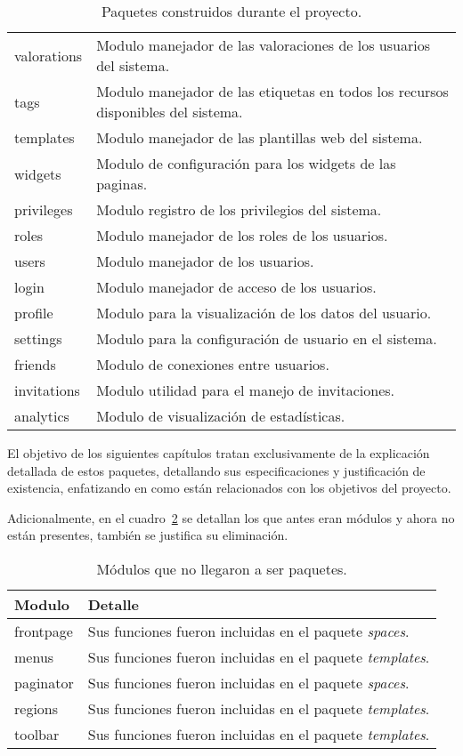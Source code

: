 \begin{table}
\begin{tabular}{l|l}
   valorations & Modulo manejador de las valoraciones de los usuarios del sistema. \\
   tags & Modulo manejador de las etiquetas en todos los recursos disponibles del sistema. \\
  templates & Modulo manejador de las plantillas web del sistema. \\
   widgets & Modulo de configuración para los widgets de las paginas. \\
privileges & Modulo registro de los privilegios del sistema. \\
  roles & Modulo manejador de los roles de los usuarios. \\
   users & Modulo manejador de los usuarios. \\
    login & Modulo manejador de acceso de los usuarios. \\
    profile & Modulo para la visualización de los datos del usuario. \\
    settings & Modulo para la configuración de usuario en el sistema. \\
    friends & Modulo de conexiones entre usuarios. \\
    invitations & Modulo utilidad para el manejo de invitaciones. \\
analytics & Modulo de visualización de estadísticas. \\
\end{tabular}
\caption{Paquetes construidos durante el proyecto.}
\label{modulos_actuales}
\end{table}

El objetivo de los siguientes capítulos tratan exclusivamente de la explicación detallada de estos paquetes, detallando sus especificaciones y justificación de existencia, enfatizando en como están relacionados con los objetivos del proyecto.

Adicionalmente, en el cuadro~\ref{modulos_eliminados} se detallan los que antes eran módulos y ahora no están presentes, también se justifica su eliminación.

\begin{table}
\begin{tabular}{l|l}
Modulo & Detalle \\
\hline
frontpage & Sus funciones fueron incluidas en el paquete \emph{spaces}. \\
menus & Sus funciones fueron incluidas en el paquete \emph{templates}. \\
paginator & Sus funciones fueron incluidas en el paquete \emph{spaces}. \\
regions & Sus funciones fueron incluidas en el paquete \emph{templates}. \\
toolbar & Sus funciones fueron incluidas en el paquete \emph{templates}. \\
\end{tabular}
\caption{Módulos que no llegaron a ser paquetes.}
\label{modulos_eliminados}
\end{table}
